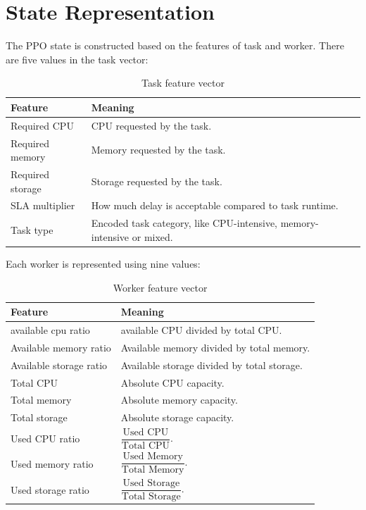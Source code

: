 \section{State Representation}

The PPO state is constructed based on the features of task and worker. There are five values in the task vector:

\begin{table}[H]
\centering
\caption{Task feature vector}
\label{tab:task_features}
\begin{tabularx}{\textwidth}{lX}
\toprule
\textbf{Feature} & \textbf{Meaning} \\
\midrule
Required CPU & CPU requested by the task. \\
Required memory & Memory requested by the task. \\
Required storage & Storage requested by the task. \\
SLA multiplier & How much delay is acceptable compared to task runtime. \\
Task type & Encoded task category, like CPU-intensive, memory-intensive or mixed. \\
\bottomrule
\end{tabularx}
\end{table}

Each worker is represented using nine values:

\begin{table}[H]
\centering
\caption{Worker feature vector}
\label{tab:worker_features}
\begin{tabularx}{\textwidth}{lX}
\toprule
\textbf{Feature} & \textbf{Meaning} \\
\midrule
available cpu ratio & available CPU divided by total CPU. \\
Available memory ratio & Available memory divided by total memory. \\
Available storage ratio & Available storage divided by total storage. \\
Total CPU & Absolute CPU capacity. \\
Total memory & Absolute memory capacity. \\
Total storage & Absolute storage capacity. \\
Used CPU ratio & $\dfrac{\text{Used CPU}}{\text{Total CPU}}$. \\
Used memory ratio & $\dfrac{\text{Used Memory}}{\text{Total Memory}}$. \\
Used storage ratio & $\dfrac{\text{Used Storage}}{\text{Total Storage}}$. \\
\bottomrule
\end{tabularx}
\end{table}

